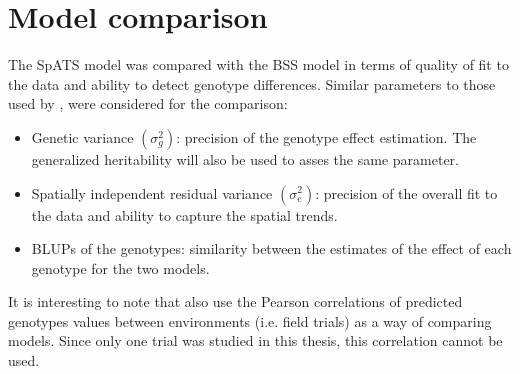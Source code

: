 \section{Model comparison}
The SpATS model was compared with the BSS model in terms of quality of fit to the data and ability to detect genotype differences. Similar parameters to those used by \textcite{velazco_modelling_2017}, were considered for the comparison:
\begin{itemize}
    \item Genetic variance $(\sigma_g^2)$: precision of the genotype effect estimation. The generalized heritability will also
    be used to asses the same parameter.
    \item Spatially independent residual variance $(\sigma_e^2)$: precision of the overall fit to the data and ability to 
    capture the spatial trends.
    \item BLUPs of the genotypes: similarity between the estimates of the effect of each genotype for the two models.
\end{itemize}
It is interesting to note that \textcite{rodriguez-alvarez_correcting_2018} also use the Pearson correlations of predicted genotypes values between environments (i.e. field trials) as a way of comparing models. Since only one trial was studied in this thesis, this correlation cannot be used.

